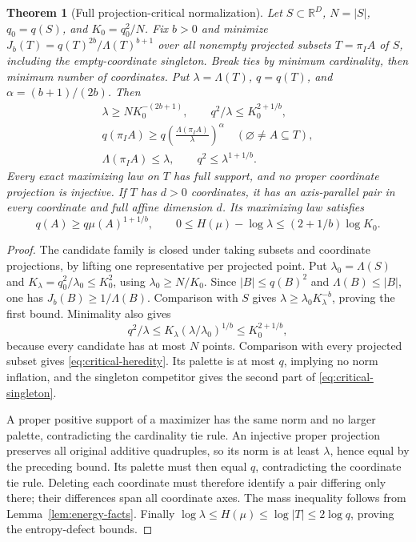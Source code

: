 \documentclass[11pt]{amsart}
\newtheorem{theorem}{Theorem}[section]
\theoremstyle{definition}
\theoremstyle{remark}
\newcommand{\R}{\mathbb{R}}
\begin{document}
\begin{theorem}[Full projection-critical normalization]\label{thm:critical-core}
Let $S\subset\R^D$, $N=|S|$, $q_0=q(S)$, and $K_0=q_0^2/N$. Fix $b>0$ and minimize $J_b(T)=q(T)^{2b}/\Lambda(T)^{b+1}$ over all nonempty projected subsets $T=\pi_I A$ of $S$, including the empty-coordinate singleton. Break ties by minimum cardinality, then minimum number of coordinates. Put $\lambda=\Lambda(T)$, $q=q(T)$, and $\alpha=(b+1)/(2b)$. Then
\begin{gather}
\lambda\ge NK_0^{-(2b+1)},\qquad q^2/\lambda\le K_0^{2+1/b},\label{eq:critical-retention}\\
q(\pi_I A)\ge q\left(\frac{\Lambda(\pi_I A)}\lambda\right)^\alpha
\quad(\varnothing\ne A\subseteq T),\label{eq:critical-heredity}\\
\Lambda(\pi_I A)\le\lambda,\qquad q^2\le\lambda^{1+1/b}.\label{eq:critical-singleton}
\end{gather}
Every exact maximizing law on $T$ has full support, and no proper coordinate projection is injective. If $T$ has $d>0$ coordinates, it has an axis-parallel pair in every coordinate and full affine dimension $d$. Its maximizing law satisfies
\[
q(A)\ge q\mu(A)^{1+1/b},\qquad
0\le H(\mu)-\log\lambda\le(2+1/b)\log K_0.
\]
\end{theorem}
\begin{proof}
The candidate family is closed under taking subsets and coordinate projections, by lifting one representative per projected point. Put $\lambda_0=\Lambda(S)$ and $K_\lambda=q_0^2/\lambda_0\le K_0^2$, using $\lambda_0\ge N/K_0$. Since $|B|\le q(B)^2$ and $\Lambda(B)\le|B|$, one has $J_b(B)\ge1/\Lambda(B)$. Comparison with $S$ gives $\lambda\ge\lambda_0K_\lambda^{-b}$, proving the first bound. Minimality also gives
\[
q^2/\lambda\le K_\lambda(\lambda/\lambda_0)^{1/b}\le K_0^{2+1/b},
\]
because every candidate has at most $N$ points. Comparison with every projected subset gives \eqref{eq:critical-heredity}. Its palette is at most $q$, implying no norm inflation, and the singleton competitor gives the second part of \eqref{eq:critical-singleton}.

A proper positive support of a maximizer has the same norm and no larger palette, contradicting the cardinality tie rule. An injective proper projection preserves all original additive quadruples, so its norm is at least $\lambda$, hence equal by the preceding bound. Its palette must then equal $q$, contradicting the coordinate tie rule. Deleting each coordinate must therefore identify a pair differing only there; their differences span all coordinate axes. The mass inequality follows from Lemma~\ref{lem:energy-facts}. Finally $\log\lambda\le H(\mu)\le\log|T|\le2\log q$, proving the entropy-defect bounds.
\end{proof}
\end{document}
